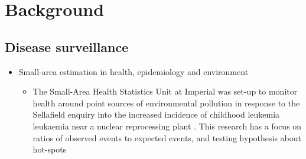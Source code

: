\documentclass[a4paper, nobind]{templates/ociamthesis}
\providecommand{\tightlist}{%
  \setlength{\itemsep}{0pt}\setlength{\parskip}{0pt}}
\begin{document}
\begin{romanpages}
\flushbottom

\tableofcontents

\listoffigures
	\mtcaddchapter

\listoftables
  \mtcaddchapter




\end{romanpages}

\flushbottom

\hypertarget{background}{%
\chapter*{Background}\label{background}}

\adjustmtc
{}

\hypertarget{disease-surveillance}{%
\section{Disease surveillance}\label{disease-surveillance}}

\begin{itemize}
\tightlist
\item
  Small-area estimation in health, epidemiology and environment

  \begin{itemize}
  \tightlist
  \item
    The Small-Area Health Statistics Unit at Imperial was set-up to monitor health around point sources of environmental pollution in response to the Sellafield enquiry into the increased incidence of childhood leukemia leukaemia near a nuclear reprocessing plant \autocite{elliott1992small}. This research has a focus on ratios of observed events to expected events, and testing hypothesis about hot-spots
  \end{itemize}
\end{itemize}
\end{document}
